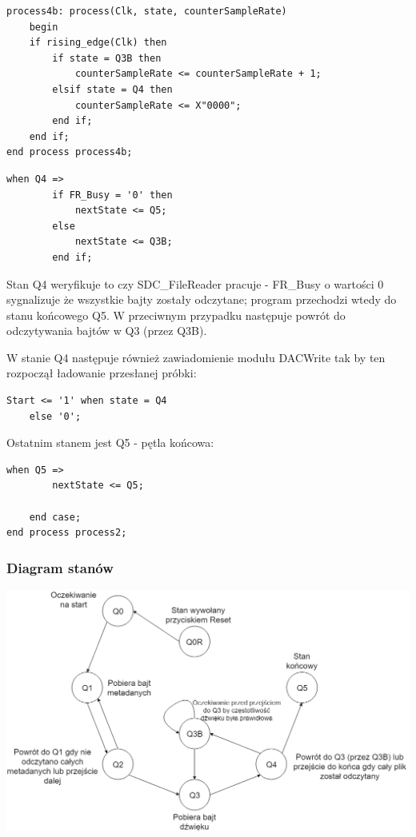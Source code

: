 \documentclass{article}
\begin{document}
\begin{lstlisting}[basicstyle=\small]
 process4b: process(Clk, state, counterSampleRate)
	begin 
	if rising_edge(Clk) then
		if state = Q3B then
			counterSampleRate <= counterSampleRate + 1;
		elsif state = Q4 then
			counterSampleRate <= X"0000";
		end if;
	end if;
end process process4b;
\end{lstlisting}
\newpage
\begin{lstlisting}[basicstyle=\small]
	when Q4 =>
		if FR_Busy = '0' then
			nextState <= Q5;
		else
			nextState <= Q3B;
		end if;
\end{lstlisting}
\par Stan Q4 weryfikuje to czy SDC\_FileReader pracuje - FR\_Busy o wartości 0 sygnalizuje że wszystkie bajty zostały odczytane; program przechodzi wtedy do stanu końcowego Q5. W przeciwnym przypadku następuje powrót do odczytywania bajtów w Q3 (przez Q3B).
\par W stanie Q4 następuje również zawiadomienie modułu DACWrite tak by ten rozpoczął ładowanie przesłanej próbki:
\begin{lstlisting}[basicstyle=\small]
Start <= '1' when state = Q4
	else '0';
\end{lstlisting}
\par Ostatnim stanem jest Q5 - pętla końcowa:
\begin{lstlisting}[basicstyle=\small]
	when Q5 =>
		nextState <= Q5;
	
	end case;
end process process2;
\end{lstlisting}
\newpage 
\subsubsection{Diagram stanów}
\begin{center}
	\includegraphics[scale=0.5, center]{photo/states.png}
\end{center}
\end{document}
